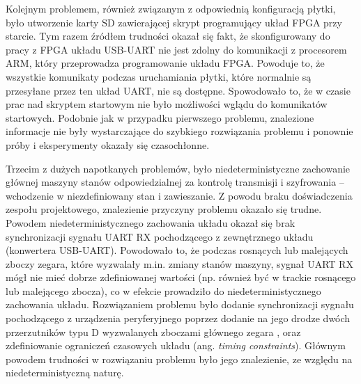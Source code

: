 Kolejnym problemem, również związanym z odpowiednią konfiguracją płytki, było utworzenie karty SD zawierającej skrypt programujący układ FPGA przy starcie. Tym razem źródłem trudności okazał się fakt, że skonfigurowany do pracy z FPGA układu USB-UART nie jest zdolny do komunikacji z procesorem ARM, który przeprowadza programowanie układu FPGA. Powoduje to, że wszystkie komunikaty podczas uruchamiania płytki, które normalnie są przesyłane przez ten układ UART, nie są dostępne. Spowodowało to, że w czasie prac nad skryptem startowym nie było możliwości wglądu do komunikatów startowych. Podobnie jak w przypadku pierwszego problemu, znalezione informacje nie były wystarczające do szybkiego rozwiązania problemu i ponownie próby i eksperymenty okazały się czasochłonne.

Trzecim z dużych napotkanych problemów, było niedeterministyczne zachowanie głównej maszyny stanów odpowiedzialnej za kontrolę transmisji i szyfrowania -- wchodzenie w niezdefiniowany stan i zawieszanie. Z powodu braku doświadczenia zespołu projektowego, znalezienie przyczyny problemu okazało się trudne. Powodem niedeterministycznego zachowania układu okazał się brak synchronizacji sygnału UART RX pochodzącego z zewnętrznego układu (konwertera USB-UART). Powodowało to, że podczas rosnących lub malejących zboczy zegara, które wyzwalały m.in. zmiany stanów maszyny, sygnał UART RX mógł nie mieć dobrze zdefiniowanej wartości (np. również być w trackie rosnącego lub malejącego zbocza), co w efekcie prowadziło do niedeterministycznego zachowania układu. Rozwiązaniem problemu było dodanie synchronizacji sygnału pochodzącego z urządzenia peryferyjnego poprzez dodanie na jego drodze dwóch przerzutników typu D wyzwalanych zboczami głównego zegara \cite{altera-metastability, 2ff-synchronization}, oraz zdefiniowanie ograniczeń czasowych układu (ang. \textit{timing constraints}). Głównym powodem trudności w rozwiązaniu problemu było jego znalezienie, ze względu na niedeterministyczną naturę.

\newpage